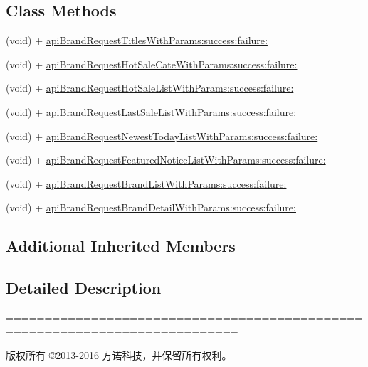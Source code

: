 \subsection*{Class Methods}
\begin{DoxyCompactItemize}
\item 
(void) + \mbox{\hyperlink{interface_j_m_brand_a_p_i_tool_ac1a6c9372da6ec0468d2b28e4d837cb1}{api\+Brand\+Request\+Titles\+With\+Params\+:success\+:failure\+:}}
\item 
(void) + \mbox{\hyperlink{interface_j_m_brand_a_p_i_tool_aa96676c2afce677a1b8e150e99512514}{api\+Brand\+Request\+Hot\+Sale\+Cate\+With\+Params\+:success\+:failure\+:}}
\item 
(void) + \mbox{\hyperlink{interface_j_m_brand_a_p_i_tool_a33986831353ae7549e5a6cbea6318817}{api\+Brand\+Request\+Hot\+Sale\+List\+With\+Params\+:success\+:failure\+:}}
\item 
(void) + \mbox{\hyperlink{interface_j_m_brand_a_p_i_tool_acbf736cea8ce3c16053bf5542dc922da}{api\+Brand\+Request\+Last\+Sale\+List\+With\+Params\+:success\+:failure\+:}}
\item 
(void) + \mbox{\hyperlink{interface_j_m_brand_a_p_i_tool_a9c5acfe03f9292c887dcab36b4800225}{api\+Brand\+Request\+Newest\+Today\+List\+With\+Params\+:success\+:failure\+:}}
\item 
(void) + \mbox{\hyperlink{interface_j_m_brand_a_p_i_tool_aac818435b4b788d80d80d570799d8079}{api\+Brand\+Request\+Featured\+Notice\+List\+With\+Params\+:success\+:failure\+:}}
\item 
(void) + \mbox{\hyperlink{interface_j_m_brand_a_p_i_tool_a1e3b3fbdfcdbef8373627be08faf05f6}{api\+Brand\+Request\+Brand\+List\+With\+Params\+:success\+:failure\+:}}
\item 
(void) + \mbox{\hyperlink{interface_j_m_brand_a_p_i_tool_a1abf2e6a218d626559caa865810c6d7c}{api\+Brand\+Request\+Brand\+Detail\+With\+Params\+:success\+:failure\+:}}
\end{DoxyCompactItemize}
\subsection*{Additional Inherited Members}


\subsection{Detailed Description}
============================================================================

版权所有 ©2013-\/2016 方诺科技，并保留所有权利。

